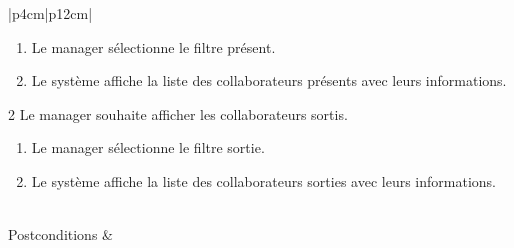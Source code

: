 \begin{longtable}{|p{4cm}|p{12cm}|}
\begin{minipage}[t]{\linewidth}
                                \begin{enumerate}[ nosep,after=\strut, ]
                                      \item Le manager sélectionne le filtre présent.  
                                      \item Le système affiche la liste des collaborateurs présents avec leurs informations.  
                                \end{enumerate}
                                2 Le manager souhaite afficher les collaborateurs sortis.
                                \begin{enumerate}[ nosep,after=\strut, ]
                                      \item Le manager sélectionne le filtre sortie.  
                                      \item Le système affiche la liste des collaborateurs sorties avec leurs informations. 
                                \end{enumerate}
                            \end{minipage}
                        \\
                        
                        \hline
                        Postconditions &   \\
                        \hline
                    \caption{Description du cas d'utilisation « Consulter la liste des collaborateurs »}\\
            \end{longtable}    
        
